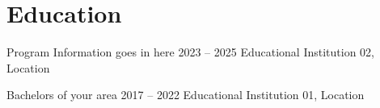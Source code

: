 \section*{Education}


\education
  {Program Information goes in here}
  {2023 – 2025}
  {Educational Institution 02, Location}

\vspace{0.5em}

\education
  {Bachelors of your area}
  {2017 – 2022}
  {Educational Institution 01, Location}
